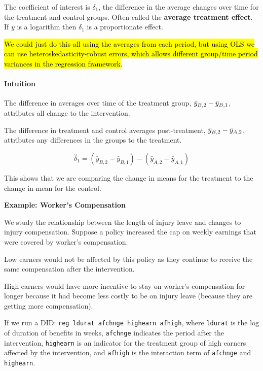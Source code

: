 \documentclass[11pt]{article}
\begin{document}
The coefficient of interest is $\delta_1$, the difference in the average changes over time for the treatment and control groups. Often called the \textbf{average treatment effect}. If $y$ is a logarithm then $\delta_1$ is a proportionate effect.

\hl{We could just do this all using the averages from each period, but using OLS we can use heteroskedasticity-robust errors, which allows different group/time period variances in the regression framework}.

\begin{shaded}
\paragraph{Intuition} \mbox{}

The difference in averages over time of the treatment group, $\Bar{y}_{B,2} - \Bar{y}_{B,1}$, attributes all change to the intervention.

The difference in treatment and control averages post-treatment, $\Bar{y}_{B,2} - \Bar{y}_{A,2}$, attributes any differences in the groups to the treatment.

\[\hat{\delta}_1=\left(\bar{y}_{B, 2}-\bar{y}_{B, 1}\right)-\left(\bar{y}_{A, 2}-\bar{y}_{A, 1}\right)\]

This shows that we are comparing the change in means for the treatment to the change in mean for the control.
    
\end{shaded}

\begin{mdframed}
    \textbf{Example: Worker's Compensation}

    We study the relationship between the length of injury leave and changes to injury compensation. Suppose a policy increased the cap on weekly earnings that were covered by worker's compensation.

    Low earners would not be affected by this policy as they continue to receive the same compensation after the intervention. 

    High earners would have more incentive to stay on worker's compensation for longer because it had become less costly to be on injury leave (because they are getting more compensation).

    If we run a DID: \lstinline{reg ldurat afchnge highearn afhigh}, where \lstinline{ldurat} is the log of duration of benefits in weeks, \lstinline{afchnge} indicates the period after the intervention, \lstinline{highearn} is an indicator for the treatment group of high earners affected by the intervention, and \lstinline{afhigh} is the interaction term of \lstinline{afchnge} and \lstinline{highearn}. 
\end{mdframed}
\end{document}
